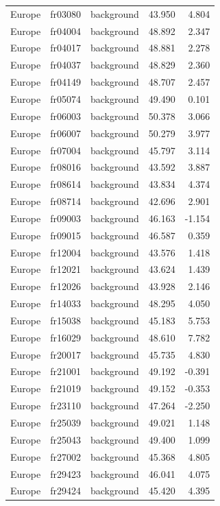 \documentclass{article}
\begin{document}
\begin{longtable}{lllrr}
Europe & fr03080 & background & 43.950 & 4.804 \\ 
Europe & fr04004 & background & 48.892 & 2.347 \\ 
Europe & fr04017 & background & 48.881 & 2.278 \\ 
Europe & fr04037 & background & 48.829 & 2.360 \\ 
Europe & fr04149 & background & 48.707 & 2.457 \\ 
Europe & fr05074 & background & 49.490 & 0.101 \\ 
Europe & fr06003 & background & 50.378 & 3.066 \\ 
Europe & fr06007 & background & 50.279 & 3.977 \\ 
Europe & fr07004 & background & 45.797 & 3.114 \\ 
Europe & fr08016 & background & 43.592 & 3.887 \\ 
Europe & fr08614 & background & 43.834 & 4.374 \\ 
Europe & fr08714 & background & 42.696 & 2.901 \\ 
Europe & fr09003 & background & 46.163 & -1.154 \\ 
Europe & fr09015 & background & 46.587 & 0.359 \\ 
Europe & fr12004 & background & 43.576 & 1.418 \\ 
Europe & fr12021 & background & 43.624 & 1.439 \\ 
Europe & fr12026 & background & 43.928 & 2.146 \\ 
Europe & fr14033 & background & 48.295 & 4.050 \\ 
Europe & fr15038 & background & 45.183 & 5.753 \\ 
Europe & fr16029 & background & 48.610 & 7.782 \\ 
Europe & fr20017 & background & 45.735 & 4.830 \\ 
Europe & fr21001 & background & 49.192 & -0.391 \\ 
Europe & fr21019 & background & 49.152 & -0.353 \\ 
Europe & fr23110 & background & 47.264 & -2.250 \\ 
Europe & fr25039 & background & 49.021 & 1.148 \\ 
Europe & fr25043 & background & 49.400 & 1.099 \\ 
Europe & fr27002 & background & 45.368 & 4.805 \\ 
Europe & fr29423 & background & 46.041 & 4.075 \\ 
Europe & fr29424 & background & 45.420 & 4.395 \\ 

\end{longtable}
\end{document}
